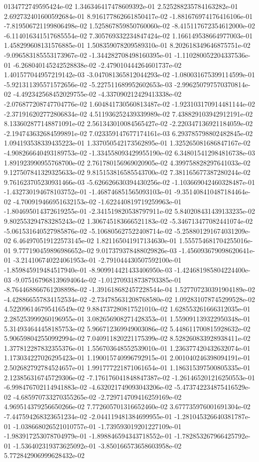 0134772749595424e-02	1.346346417478609392e-01	2.525288235784163282e-01	2.692732401600592684e-01	8.916177862661850417e-02	-1.881676974176416106e-01	-7.819506721199806498e-02	1.525867859850760060e-02	-8.415117672354612000e-02	-6.114016341517685554e-02	7.305769332234847424e-02	1.166149538664977003e-01	1.458299608131576885e-01	1.508359078209589310e-01	8.202618349646875751e-02	-9.096583185553173967e-02	-1.344282708498160395e-01	-1.110280052204337536e-01	-6.268040145242528838e-02	-2.479010444264601737e-02	1.401577044957219142e-03	-3.047081365812044293e-02	-1.080031675399114599e-01	-5.921311395571572656e-02	-5.227511689952602653e-03	-2.996250797570370814e-02	-4.492342568452029755e-02	-4.337090212429413338e-02	-2.076877208747704776e-02	1.604841730560813487e-02	-1.923103170914481144e-02	-2.371916202772806834e-02	4.511936252439339989e-02	7.438829103942912191e-02	8.133602877148871091e-02	2.561343010084565427e-02	-2.220347136921184059e-02	-2.194743632684599891e-02	7.023359147677174161e-03	6.293785798802482845e-02	1.094193538339435223e-01	1.337050542173562895e-01	1.325265081686847167e-02	-4.908266640493189753e-02	-1.334558093429955190e-02	6.348015412984816738e-03	1.891923990955768700e-02	2.761780156969020905e-02	4.399758828297641033e-02	9.127507841329325633e-02	9.815153816585543700e-02	7.381165677387280244e-02	9.761623705230931466e-03	-5.626626630394430256e-02	-1.103669042460328487e-01	-1.432730194678103752e-01	-1.468746851565093103e-01	-9.351408410487184464e-02	-4.700919466951632153e-02	-1.622440819719259963e-01	-1.804695014372619255e-01	-2.341519820538797911e-02	5.840208431439133235e-02	9.802553294783285243e-02	1.306745183666521183e-02	-5.346713477082441074e-02	-5.061531640527985876e-02	-5.106805627522408714e-02	-5.258801291674031209e-02	6.464970519122573145e-02	1.821165041917134630e-01	1.555754681704255016e-01	9.777190459896986652e-02	9.017379378488029826e-03	-1.456093679098620641e-01	-3.214106740224061953e-01	-2.791044430507592100e-01	-1.859845919484517940e-01	-8.909914421433406950e-03	-1.424681985804224400e-03	-9.075167968139694064e-02	-1.012709318738793385e-01	-8.764468866761208898e-02	-1.391618682457228544e-04	1.527707230391904189e-02	-4.428866557834152534e-02	-2.734785631208768580e-02	1.092831078745299528e-02	4.522096146795416549e-02	9.884737280817521010e-02	1.628553261666312035e-01	2.285253999260196955e-01	3.082656908271428353e-01	1.559091139322950348e-01	5.314934644458185753e-02	5.966712369949003086e-02	5.448611700815928632e-02	5.906598042550992994e-02	7.040911820221175399e-02	8.528260833928938411e-02	1.377812287832355376e-01	1.556703648552539010e-01	1.236377420432632074e-01	1.173034227026295423e-01	1.190015740996792915e-01	2.001040246398094191e-01	2.502682792784524657e-01	1.991777221871061654e-01	1.186315397500805335e-01	2.123856316745729306e-02	-7.176176041848847387e-02	-1.261465201216250553e-01	-6.998476702114941883e-02	-4.632021749093043206e-02	-5.473742234875416529e-02	-4.685970733270355265e-02	-2.729714709416259169e-02	4.969514379256650266e-02	7.772605701316652460e-02	3.677735976001691304e-02	-7.447594268323651234e-02	-2.044119481384699955e-01	-1.281045326640381787e-01	-1.038668026521010757e-01	-1.739593019201227109e-01	-1.983917253078704979e-01	-1.898846594343718552e-01	-1.782853267966425792e-01	-1.536402319373625092e-01	-3.850166573658603958e-02	5.772842906999628432e-02	